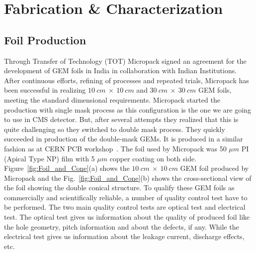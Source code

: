\section{Fabrication \& Characterization} %
\label{sec:fabrication_&_characterization}
\subsection{Foil Production}
Through Transfer of Technology (TOT) Micropack signed an agreement for the development of GEM foils in India in collaboration with Indian Institutions. 
After continuous efforts, refining of processes and repeated trials, Micropack has been successful in realizing $10~cm~\times~10~cm$ and $30~cm~\times~30~cm$ GEM foils, meeting the standard dimensional requirements.
Micropack started the production with single mask process as this configuration is the one we are going to use in CMS detector.
But, after several attempts they realized that this is quite challenging so they switched to double mask process. They quickly succeeded in production of the double-mask GEMs.
It is produced in a similar fashion as at CERN PCB workshop~\cite{DEOLIVEIRA2009}.
The foil used by Micropack was 50 $\mu m$ PI (Apical Type NP) film with 5 $\mu m$ copper coating on both side. Figure~\ref{fig:Foil_and_Cone}(a) shows the $10~cm~\times~10~cm$ GEM foil produced by Micropack and the Fig.~\ref{fig:Foil_and_Cone}(b) shows the cross-sectional view of the foil showing the double conical structure.
To qualify these GEM foils as commercially and scientifically reliable, a number of quality control test have to be performed. 
The two main quality control tests are optical test and electrical test. The optical test gives us information about the quality of produced foil like the hole geometry, pitch information and about the defects, if any. 
While the electrical test gives us information about the leakage current, discharge effects, etc.
